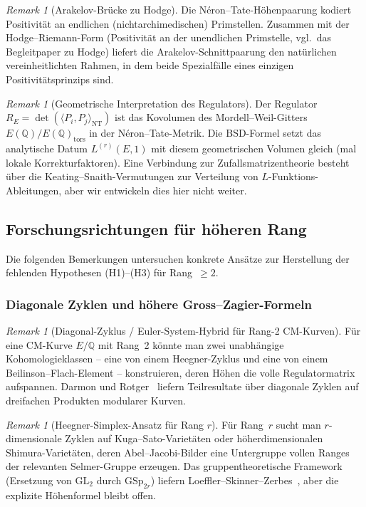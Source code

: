 \documentclass[aps,prd,twocolumn,superscriptaddress,nofootinbib,floatfix]{revtex4-2}
\theoremstyle{definition}
\theoremstyle{remark}
\newtheorem{remark}[theorem]{Remark}
\begin{document}
\begin{remark}[Arakelov-Brücke zu Hodge]
\label{rem:arakelov-bridge}
Die Néron--Tate-Höhenpaarung kodiert Positivität an endlichen (nichtarchimedischen) Primstellen. Zusammen mit der Hodge--Riemann-Form (Positivität an der unendlichen Primstelle, vgl.\ das Begleitpaper zu Hodge) liefert die Arakelov-Schnittpaarung den natürlichen vereinheitlichten Rahmen, in dem beide Spezialfälle eines einzigen Positivitätsprinzips sind.
\end{remark}


\begin{remark}[Geometrische Interpretation des Regulators]
\label{rem:entropic-capacity}
Der Regulator $R_E = \det(\langle P_i, P_j \rangle_{\mathrm{NT}})$ ist das Kovolumen des Mordell--Weil-Gitters $E(\mathbb{Q})/E(\mathbb{Q})_{\mathrm{tors}}$ in der Néron--Tate-Metrik. Die BSD-Formel setzt das analytische Datum $L^{(r)}(E,1)$ mit diesem geometrischen Volumen gleich (mal lokale Korrekturfaktoren). Eine Verbindung zur Zufallsmatrizentheorie besteht über die Keating--Snaith-Vermutungen zur Verteilung von $L$-Funktions-Ableitungen, aber wir entwickeln dies hier nicht weiter.
\end{remark}

\subsection{Forschungsrichtungen für höheren Rang}
\label{sec:higher_rank_directions}

Die folgenden Bemerkungen untersuchen konkrete Ansätze zur Herstellung der fehlenden Hypothesen (H1)--(H3) für Rang~$\geq 2$.

\subsubsection{Diagonale Zyklen und höhere Gross--Zagier-Formeln}

\begin{remark}[Diagonal-Zyklus / Euler-System-Hybrid für Rang-2 CM-Kurven]
\label{rem:diagonal-euler}
Für eine CM-Kurve $E/\mathbb{Q}$ mit Rang~2 könnte man zwei unabhängige Kohomologieklassen -- eine von einem Heegner-Zyklus und eine von einem Beilinson--Flach-Element -- konstruieren, deren Höhen die volle Regulatormatrix aufspannen. Darmon und Rotger~\cite{DarmonRotger2017} liefern Teilresultate über diagonale Zyklen auf dreifachen Produkten modularer Kurven.
\end{remark}

\begin{remark}[Heegner-Simplex-Ansatz für Rang $r$]
\label{rem:heegner-simplex}
Für Rang~$r$ sucht man $r$-dimensionale Zyklen auf Kuga--Sato-Varietäten oder höherdimensionalen Shimura-Varietäten, deren Abel--Jacobi-Bilder eine Untergruppe vollen Ranges der relevanten Selmer-Gruppe erzeugen. Das gruppentheoretische Framework (Ersetzung von $\mathrm{GL}_2$ durch $\mathrm{GSp}_{2r}$) liefern Loeffler--Skinner--Zerbes~\cite{LSZ2020}, aber die explizite Höhenformel bleibt offen.
\end{remark}
\end{document}
